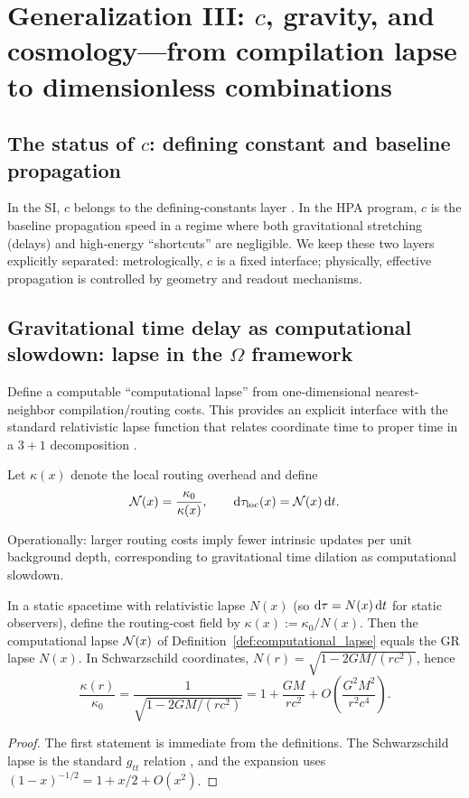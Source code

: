 \section{Generalization III: \texorpdfstring{$c$}{c}, gravity, and cosmology---from compilation lapse to dimensionless combinations}
\label{sec:gravity_cosmology}

\subsection{The status of \texorpdfstring{$c$}{c}: defining constant and baseline propagation}
In the SI, $c$ belongs to the defining-constants layer \cite{BIPMSI2019}. In the HPA program, $c$ is the baseline propagation speed in a regime where both gravitational stretching (delays) and high-energy ``shortcuts'' are negligible. We keep these two layers explicitly separated: metrologically, $c$ is a fixed interface; physically, effective propagation is controlled by geometry and readout mechanisms.

\subsection{Gravitational time delay as computational slowdown: lapse in the \texorpdfstring{$\Omega$}{Omega} framework}
Define a computable ``computational lapse'' from one-dimensional nearest-neighbor compilation/routing costs. This provides an explicit interface with the standard relativistic lapse function that relates coordinate time to proper time in a $3+1$ decomposition \cite{Wald1984}.
\begin{definition}\label{def:computational_lapse}
Let $\kappa(x)$ denote the local routing overhead and define
\begin{equation}
\mathcal{N}(x)=\frac{\kappa_0}{\kappa(x)},\qquad \mathrm{d}\tau_{\mathrm{loc}}(x)=\mathcal{N}(x)\,\mathrm{d} t.
\end{equation}
\end{definition}
Operationally: larger routing costs imply fewer intrinsic updates per unit background depth, corresponding to gravitational time dilation as computational slowdown.

\begin{proposition}\label{prop:omega_gr_lapse_interface}
In a static spacetime with relativistic lapse $N(x)$ (so $\mathrm{d}\tau=N(x)\,\mathrm{d} t$ for static observers), define the routing-cost field by $\kappa(x):=\kappa_0/N(x)$. Then the computational lapse $\mathcal{N}(x)$ of Definition~\ref{def:computational_lapse} equals the GR lapse $N(x)$. In Schwarzschild coordinates, $N(r)=\sqrt{1-2GM/(rc^2)}$, hence
\begin{equation}
\frac{\kappa(r)}{\kappa_0}=\frac{1}{\sqrt{1-2GM/(rc^2)}}=1+\frac{GM}{rc^2}+O\!\left(\frac{G^2M^2}{r^2c^4}\right).
\end{equation}
\end{proposition}
\begin{proof}
The first statement is immediate from the definitions. The Schwarzschild lapse is the standard $g_{tt}$ relation \cite{Wald1984}, and the expansion uses $(1-x)^{-1/2}=1+x/2+O(x^2)$.
\end{proof}

